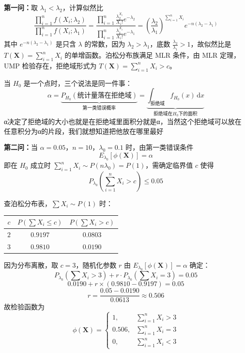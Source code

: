 \begin{solution}
\textbf{第一问：}取 $\lambda_1 < \lambda_2$，计算似然比
$$\frac{\prod_{i=1}^n f(X_i;\lambda_2)}{\prod_{i=1}^n f(X_i;\lambda_1)} = \frac{\prod_{i=1}^n \frac{\lambda_2^{X_i}}{X_i!}e^{-\lambda_2}}{\prod_{i=1}^n \frac{\lambda_1^{X_i}}{X_i!}e^{-\lambda_1}} = \left(\frac{\lambda_2}{\lambda_1}\right)^{\sum_{i=1}^n X_i} e^{-n(\lambda_2 - \lambda_1)}$$
其中 $e^{-n(\lambda_2-\lambda_1)}$ 是只含 $\lambda$ 的常数，因为 $\lambda_2 > \lambda_1$，底数 $\frac{\lambda_2}{\lambda_1} > 1$，故似然比是 $T(\boldsymbol{X}) = \sum_{i=1}^n X_i$ 的单增函数。泊松分布族满足 MLR 条件，由 MLR 定理，UMP 检验存在，拒绝域形式为 $T(\boldsymbol{X}) = \sum_{i=1}^n X_i > c$。
\begin{dxtips}
    当 $H_0$ 是一个点时，三个说法是同一件事：
$$\alpha = \underbrace{P_{H_0}(\text{统计量落在拒绝域})}_{\text{第一类错误概率}} = \underbrace{\int_{\text{拒绝域}} f_{H_0}(x)\,\mathrm{d}x}_{\text{拒绝域在}H_0\text{下的面积}}$$
α决定了拒绝域的大小也就是在拒绝域里面积分就是α，当然这个拒绝域可以放在任意积分为α的片段，我们就想知道把他放在哪里最好
\end{dxtips}
\textbf{第二问：}当 $\alpha = 0.05$，$n = 10$，$\lambda_0 = 0.1$ 时，由第一类错误条件
$$E_{\lambda_0}[\phi(\boldsymbol{X})] = \alpha$$
即在 $H_0$ 成立时 $\sum_{i=1}^n X_i \sim P(n\lambda_0) = P(1)$，需确定临界值 $c$ 使得
$$P_{\lambda_0}\left(\sum_{i=1}^n X_i > c\right) \leq 0.05$$

查泊松分布表，$\sum X_i \sim P(1)$ 时：
\begin{center}
\begin{tabular}{ccc}
\hline
$c$ & $P(\sum X_i \leq c)$ & $P(\sum X_i > c)$ \\
\hline
$2$ & $0.9197$ & $0.0803$ \\
$3$ & $0.9810$ & $0.0190$ \\
\hline
\end{tabular}
\end{center}
因为分布离散，取 $c = 3$，随机化参数 $r$ 由 $E_{\lambda_0}[\phi(\boldsymbol{X})] = \alpha$ 确定：
$$P_{\lambda_0}\left(\sum X_i > 3\right) + r \cdot P_{\lambda_0}\left(\sum X_i = 3\right) = 0.05$$
$$0.0190 + r \times (0.9810 - 0.9197) = 0.05$$
$$r = \frac{0.05 - 0.0190}{0.0613} \approx 0.506$$
故检验函数为
$$\phi(\boldsymbol{X}) = \begin{cases} 1, & \sum_{i=1}^n X_i > 3 \\ 0.506, & \sum_{i=1}^n X_i = 3 \\ 0, & \sum_{i=1}^n X_i < 3 \end{cases}$$
\end{solution}
